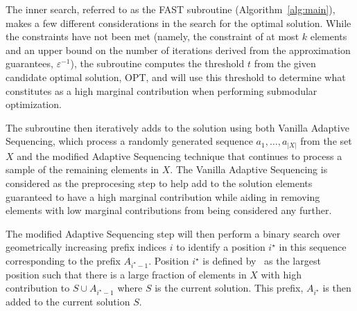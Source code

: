 \documentclass[11pt, a4paper]{article}
\begin{document}
The inner search, referred to as the \textsc{FAST} subroutine (Algorithm~\ref{alg:main}), makes a few different considerations in the search for the optimal solution. While the constraints have not been met (namely, the constraint of at most $k$ elements and an upper bound on the number of iterations derived from the approximation guarantees, $\varepsilon^{-1}$), the subroutine computes the threshold $t$ from the given candidate optimal solution, OPT, and will use this threshold to determine what constitutes as a high marginal contribution when performing submodular optimization.

The subroutine then iteratively adds to the solution using both Vanilla Adaptive Sequencing, which process a randomly generated sequence $a_1, \ldots, a_{|X|}$ from the set $X$ and the modified Adaptive Sequencing technique that continues to process a sample of the remaining elements in $X$. The Vanilla Adaptive Sequencing is considered as the preprocesing step to help add to the solution elements guaranteed to have a high marginal contribution while aiding in removing elements with low marginal contributions from being considered any further.

The modified Adaptive Sequencing step will then perform a binary search over geometrically increasing prefix indices $i$ to identify a position $i^{\star}$ in this sequence corresponding to the prefix $A_{i^{\star} - 1}$. Position $i^{\star}$ is defined by~\cite{breuer2019fast} as the largest position such that there is a large fraction of elements in $X$ with high contribution to $S \cup A_{i^{\star} - 1}$ where $S$ is the current solution. This prefix, $A_{i^{\star}}$ is then added to the current solution $S$.

\end{document}
